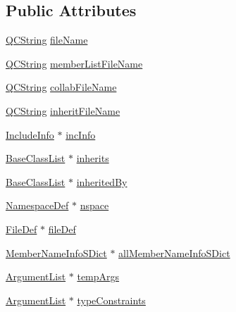 \subsection*{Public Attributes}
\begin{DoxyCompactItemize}
\item 
\mbox{\hyperlink{class_q_c_string}{Q\+C\+String}} \mbox{\hyperlink{class_class_def_impl_af4852c18aa3acaa24dd3056896a51605}{file\+Name}}
\item 
\mbox{\hyperlink{class_q_c_string}{Q\+C\+String}} \mbox{\hyperlink{class_class_def_impl_adf2a14df16fc2bbf27a9bc928f15b7eb}{member\+List\+File\+Name}}
\item 
\mbox{\hyperlink{class_q_c_string}{Q\+C\+String}} \mbox{\hyperlink{class_class_def_impl_a06cff6a1a96e99c26cd50bf1250bbf36}{collab\+File\+Name}}
\item 
\mbox{\hyperlink{class_q_c_string}{Q\+C\+String}} \mbox{\hyperlink{class_class_def_impl_adcf9ff4fb9cc0c6519e58143057ba078}{inherit\+File\+Name}}
\item 
\mbox{\hyperlink{struct_include_info}{Include\+Info}} $\ast$ \mbox{\hyperlink{class_class_def_impl_abff21ee2a293a91dd508f664930ab6bc}{inc\+Info}}
\item 
\mbox{\hyperlink{class_base_class_list}{Base\+Class\+List}} $\ast$ \mbox{\hyperlink{class_class_def_impl_a4dd8dc3a52eaf754b7d567a4dc3e0780}{inherits}}
\item 
\mbox{\hyperlink{class_base_class_list}{Base\+Class\+List}} $\ast$ \mbox{\hyperlink{class_class_def_impl_a9134929b4e91fa202dad541f7a9c89ac}{inherited\+By}}
\item 
\mbox{\hyperlink{class_namespace_def}{Namespace\+Def}} $\ast$ \mbox{\hyperlink{class_class_def_impl_ab48a04c16cebd115877f07f540b44c15}{nspace}}
\item 
\mbox{\hyperlink{class_file_def}{File\+Def}} $\ast$ \mbox{\hyperlink{class_class_def_impl_ac2c8c9c6cc2cea9076ad649149505f1a}{file\+Def}}
\item 
\mbox{\hyperlink{class_member_name_info_s_dict}{Member\+Name\+Info\+S\+Dict}} $\ast$ \mbox{\hyperlink{class_class_def_impl_ae645a7a6aceae390224919d15d6df80b}{all\+Member\+Name\+Info\+S\+Dict}}
\item 
\mbox{\hyperlink{class_argument_list}{Argument\+List}} $\ast$ \mbox{\hyperlink{class_class_def_impl_aacfd7b41980ab90e43e015ca2583a56c}{temp\+Args}}
\item 
\mbox{\hyperlink{class_argument_list}{Argument\+List}} $\ast$ \mbox{\hyperlink{class_class_def_impl_af0266bc567e2d9eed094e5ced846ddac}{type\+Constraints}}

\end{DoxyCompactItemize}
